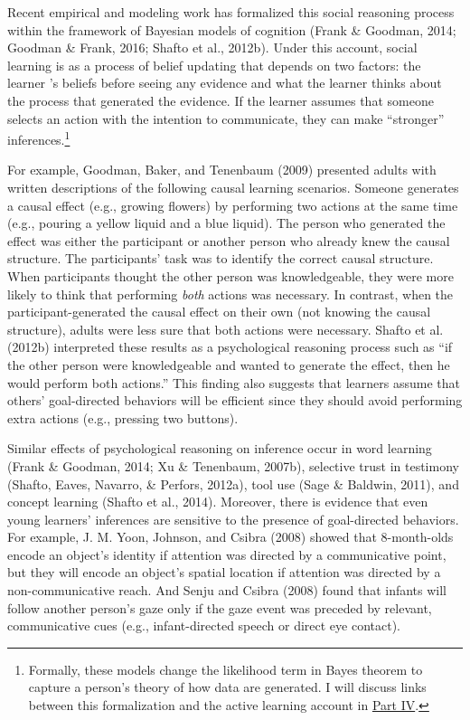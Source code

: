 \documentclass[english,floatsintext,man]{apa6}
\theoremstyle{definition}
\theoremstyle{definition}
\theoremstyle{definition}
\theoremstyle{remark}
\begin{document}
Recent empirical and modeling work has formalized this social reasoning
process within the framework of Bayesian models of cognition (Frank \&
Goodman, 2014; Goodman \& Frank, 2016; Shafto et al., 2012b). Under this
account, social learning is as a process of belief updating that depends
on two factors: the learner 's beliefs before seeing any evidence and
what the learner thinks about the process that generated the evidence.
If the learner assumes that someone selects an action with the intention
to communicate, they can make \enquote{stronger} inferences.\footnote{Formally,
  these models change the likelihood term in Bayes theorem to capture a
  person's theory of how data are generated. I will discuss links
  between this formalization and the active learning account in
  \protect\hyperlink{p4}{Part IV}.}

For example, Goodman, Baker, and Tenenbaum (2009) presented adults with
written descriptions of the following causal learning scenarios. Someone
generates a causal effect (e.g., growing flowers) by performing two
actions at the same time (e.g., pouring a yellow liquid and a blue
liquid). The person who generated the effect was either the participant
or another person who already knew the causal structure. The
participants' task was to identify the correct causal structure. When
participants thought the other person was knowledgeable, they were more
likely to think that performing \emph{both} actions was necessary. In
contrast, when the participant-generated the causal effect on their own
(not knowing the causal structure), adults were less sure that both
actions were necessary. Shafto et al. (2012b) interpreted these results
as a psychological reasoning process such as \enquote{if the other
person were knowledgeable and wanted to generate the effect, then he
would perform both actions.} This finding also suggests that learners
assume that others' goal-directed behaviors will be efficient since they
should avoid performing extra actions (e.g., pressing two buttons).

Similar effects of psychological reasoning on inference occur in word
learning (Frank \& Goodman, 2014; Xu \& Tenenbaum, 2007b), selective
trust in testimony (Shafto, Eaves, Navarro, \& Perfors, 2012a), tool use
(Sage \& Baldwin, 2011), and concept learning (Shafto et al., 2014).
Moreover, there is evidence that even young learners' inferences are
sensitive to the presence of goal-directed behaviors. For example, J. M.
Yoon, Johnson, and Csibra (2008) showed that 8-month-olds encode an
object's identity if attention was directed by a communicative point,
but they will encode an object's spatial location if attention was
directed by a non-communicative reach. And Senju and Csibra (2008) found
that infants will follow another person's gaze only if the gaze event
was preceded by relevant, communicative cues (e.g., infant-directed
speech or direct eye contact).
\end{document}
